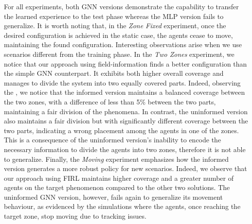 For all experiments, both \ac{GNN} versions demonstrate the capability to transfer the learned experience to the test phase whereas the MLP version fails to generalize. 
%
It is worth noting that, in the \emph{Zone Fixed} experiment, %
 once the desired configuration is achieved in the static case, 
 the agents cease to move, maintaining the found configuration.
%
Interesting observations arise when we use scenarios different from the training phase. 
In the \emph{Two Zones} experiment,
 we notice that our approach using field-information finds a better configuration than the simple GNN counterpart. 
%
It exhibits both higher overall coverage and manages to divide the system into two equally covered parts. 
%
Indeed, observing the , we notice that the informed version maintains a balanced coverage between the two zones, 
 with a difference of less than 5\% between the two parts, maintaining a fair division of the phenomena.
%
In contrast, the uninformed version also maintains a fair division but with significantly different coverage between the two parts, 
 indicating a wrong placement among the agents in one of the zones.
%
This is a consequence of the uninformed version's inability to encode the necessary information to divide the agents into two zones, therefore it is not able to generalize.
%
Finally, the \emph{Moving} experiment emphasizes how the informed version generates a more robust policy for new scenarios. 
 Indeed, we observe that our approach using \ac{FIRL} maintains higher coverage and a greater number of agents on the target phenomenon compared to the other two solutions.
%
The uninformed GNN version, however, 
 fails again to generalize its movement behaviour, as evidenced by the simulations where the agents, once reaching the target zone, stop moving due to tracking issues.

